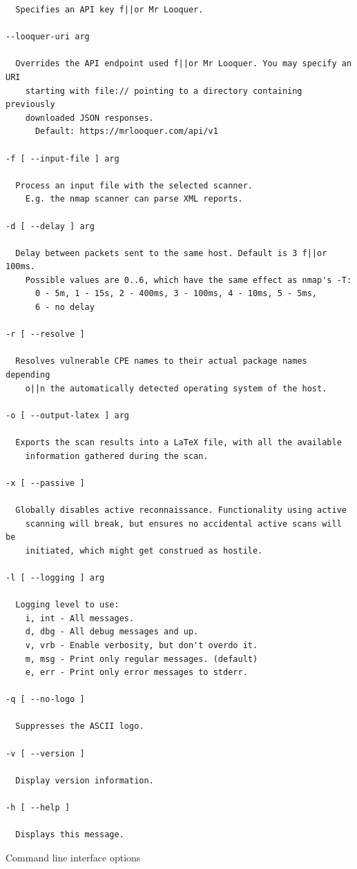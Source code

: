 \documentclass[a4paper,12pt]{article}
\begin{document}
\begin{verbatim}
  Specifies an API key f||or Mr Looquer.

--looquer-uri arg

  Overrides the API endpoint used f||or Mr Looquer. You may specify an URI
    starting with file:// pointing to a directory containing previously
    downloaded JSON responses.
      Default: https://mrlooquer.com/api/v1

-f [ --input-file ] arg

  Process an input file with the selected scanner.
    E.g. the nmap scanner can parse XML reports.

-d [ --delay ] arg

  Delay between packets sent to the same host. Default is 3 f||or 100ms.
    Possible values are 0..6, which have the same effect as nmap's -T:
      0 - 5m, 1 - 15s, 2 - 400ms, 3 - 100ms, 4 - 10ms, 5 - 5ms,
      6 - no delay

-r [ --resolve ]

  Resolves vulnerable CPE names to their actual package names depending
    o||n the automatically detected operating system of the host.

-o [ --output-latex ] arg

  Exports the scan results into a LaTeX file, with all the available
    information gathered during the scan.

-x [ --passive ]

  Globally disables active reconnaissance. Functionality using active
    scanning will break, but ensures no accidental active scans will be
    initiated, which might get construed as hostile.

-l [ --logging ] arg

  Logging level to use:
    i, int - All messages.
    d, dbg - All debug messages and up.
    v, vrb - Enable verbosity, but don't overdo it.
    m, msg - Print only regular messages. (default)
    e, err - Print only error messages to stderr.

-q [ --no-logo ]

  Suppresses the ASCII logo.

-v [ --version ]

  Display version information.

-h [ --help ]

  Displays this message.
	\end{verbatim}
	\vspace{-0.3in}
	\begin{listing}[H]
		\caption{Command line interface options}
		\label{clihelp}
	\end{listing}
\end{document}
